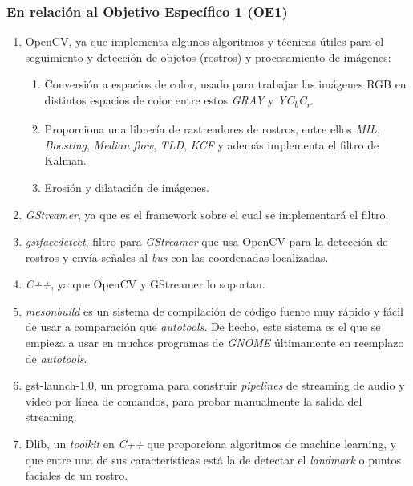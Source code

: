 \documentclass[a4paper,openright,12pt]{report}
\begin{document}
\subsubsection{En relación al Objetivo Específico 1 (OE1)}
\begin{enumerate}
    \item OpenCV, ya que implementa algunos algoritmos y técnicas
        útiles para el seguimiento y detección de objetos (rostros) y
        procesamiento de imágenes:
    \begin{enumerate}
        \item Conversión a espacios de color, usado para trabajar las imágenes
            RGB en distintos espacios de color entre estos \textit{GRAY} y
            \textit{YC\textsubscript{b}C\textsubscript{r}}.
        \item Proporciona una librería de rastreadores de rostros, entre ellos
            \textit{MIL}, \textit{Boosting}, \textit{Median flow}, \textit{TLD},
            \textit{KCF} y además implementa el filtro de Kalman.
        \item Erosión y dilatación de imágenes.
    \end{enumerate}
    \item \textit{GStreamer}, ya que es el framework sobre el cual se
        implementará el filtro.
    \item \textit{gstfacedetect}, filtro para \textit{GStreamer} que usa OpenCV
        para la detección de rostros y envía señales al \textit{bus} con las
        coordenadas localizadas.
    \item \textit{C++}, ya que OpenCV y GStreamer lo soportan.
    \item \textit{mesonbuild} es un sistema de compilación de código fuente muy
    rápido \cite{mesonbuildComparison} y fácil de usar a comparación que
    \textit{autotools}. De hecho, este sistema es el que se empieza a usar en
    muchos programas de \textit{GNOME} últimamente en reemplazo de \textit{autotools}.
    \item gst-launch-1.0, un programa para construir \textit{pipelines} de
    streaming de audio y video por línea de comandos, para probar manualmente
    la salida del streaming.
    \item Dlib, un \textit{toolkit} en \textit{C++} que proporciona algoritmos
    de machine learning, y que entre una de sus características está la de
    detectar el \textit{landmark} o puntos faciales de un rostro.
\end{enumerate}
\end{document}
